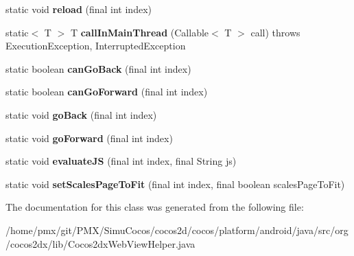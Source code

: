\begin{DoxyCompactItemize}
static void {\bfseries reload} (final int index)
\item 
\mbox{\label{classorg_1_1cocos2dx_1_1lib_1_1Cocos2dxWebViewHelper_a159dba7d23b24945bf25c40cb3fe1280}} 
static$<$ T $>$ T {\bfseries call\+In\+Main\+Thread} (Callable$<$ T $>$ call)  throws Execution\+Exception, Interrupted\+Exception 
\item 
\mbox{\label{classorg_1_1cocos2dx_1_1lib_1_1Cocos2dxWebViewHelper_a1df26a1edb7a428cd82bd72cfe772c9b}} 
static boolean {\bfseries can\+Go\+Back} (final int index)
\item 
\mbox{\label{classorg_1_1cocos2dx_1_1lib_1_1Cocos2dxWebViewHelper_ad90244d00b4d47df9356871d922e9176}} 
static boolean {\bfseries can\+Go\+Forward} (final int index)
\item 
\mbox{\label{classorg_1_1cocos2dx_1_1lib_1_1Cocos2dxWebViewHelper_ae521dec4b9cff13c771bc1818a656c33}} 
static void {\bfseries go\+Back} (final int index)
\item 
\mbox{\label{classorg_1_1cocos2dx_1_1lib_1_1Cocos2dxWebViewHelper_a7b6a8dae8dd16835905725d6b22b4550}} 
static void {\bfseries go\+Forward} (final int index)
\item 
\mbox{\label{classorg_1_1cocos2dx_1_1lib_1_1Cocos2dxWebViewHelper_ac5048999609f5cbafa5dde381f8a9b2b}} 
static void {\bfseries evaluate\+JS} (final int index, final String js)
\item 
\mbox{\label{classorg_1_1cocos2dx_1_1lib_1_1Cocos2dxWebViewHelper_af73a160f8b87692ce90951283e844020}} 
static void {\bfseries set\+Scales\+Page\+To\+Fit} (final int index, final boolean scales\+Page\+To\+Fit)
\end{DoxyCompactItemize}


The documentation for this class was generated from the following file\+:\begin{DoxyCompactItemize}
\item 
/home/pmx/git/\+P\+M\+X/\+Simu\+Cocos/cocos2d/cocos/platform/android/java/src/org/cocos2dx/lib/Cocos2dx\+Web\+View\+Helper.\+java\end{DoxyCompactItemize}
